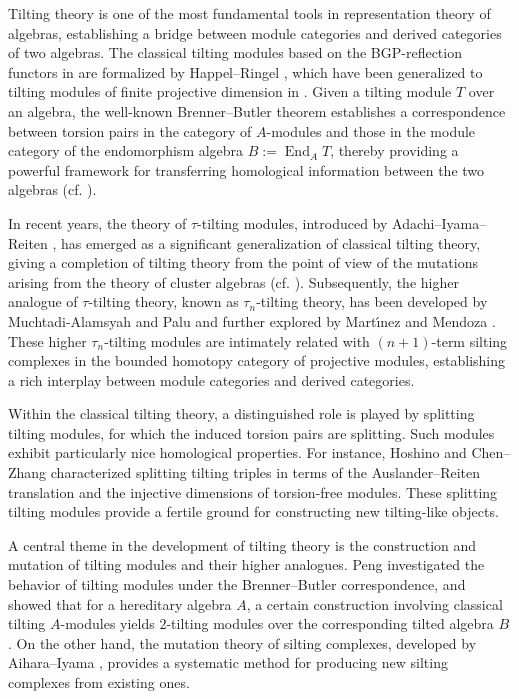 \documentclass[reqno,12pt]{amsart}
\numberwithin{equation}{section}
\theoremstyle{plain}
\theoremstyle{definition}
\begin{document}
Tilting theory is one of the most fundamental tools in representation theory of algebras, establishing a bridge between module categories and derived categories of two algebras. The classical tilting modules based on the BGP-reflection functors in \cite{Ausl,BGP,BB} are formalized by
Happel--Ringel \cite{Happel}, which have been generalized to tilting modules of finite projective dimension in \cite{MIY,Happel2}. Given a tilting module $T$ over an algebra,
the well-known Brenner--Butler theorem establishes a correspondence between torsion pairs in the category of $A$-modules and those in the module category of the endomorphism algebra $B:=\operatorname{End}_A T$,
thereby providing a powerful framework for transferring homological information between the two algebras (cf. \cite{ASS}).

In recent years, the theory of $\tau$-tilting modules, introduced by Adachi--Iyama--Reiten
\cite{ADA}, has emerged as a significant generalization of classical tilting theory, giving
a completion of tilting theory from the point of view of the mutations arising
from the theory of cluster algebras (cf. \cite{Fomin1,Fomin2}). Subsequently, the higher analogue of $\tau$-tilting theory, known as $\tau_n$-tilting theory, has been developed by Muchtadi-Alamsyah and Palu \cite{MUC} and further explored by Mart\'{\i}nez and Mendoza \cite{MAR}. These higher $\tau_n$-tilting modules are intimately related with $(n+1)$-term silting complexes in the bounded homotopy category of projective modules, establishing a rich interplay between module categories and derived categories.

Within the classical tilting theory, a distinguished role is played by splitting tilting modules, for which the induced torsion pairs are splitting. Such modules exhibit particularly nice homological properties. For instance, Hoshino \cite{HOS} and Chen--Zhang \cite{CHE} characterized splitting tilting triples in terms of the Auslander--Reiten translation and the injective dimensions of torsion-free modules. These splitting tilting modules provide a fertile ground for constructing new tilting-like objects.

A central theme in the development of tilting theory is the construction and mutation of tilting modules and their higher analogues. Peng \cite{PENG} investigated the behavior of tilting modules under the Brenner--Butler correspondence, and showed that for a hereditary algebra $A$, a certain construction involving classical tilting $A$-modules yields $2$-tilting modules over the corresponding tilted algebra $B$. On the other hand, the mutation theory of silting complexes, developed by Aihara--Iyama \cite{AIHA}, provides a systematic method for producing new silting complexes from existing ones.
\end{document}
